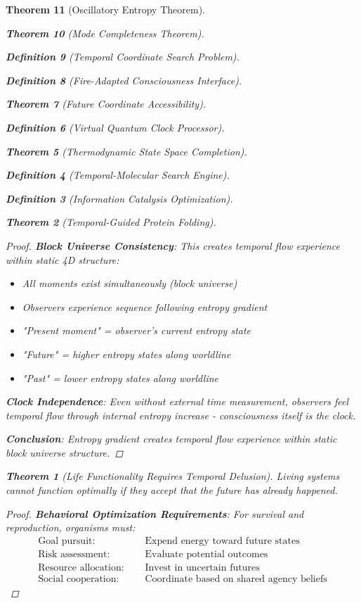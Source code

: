 \documentclass[12pt,a4paper]{article}
\newtheorem{theorem}{Theorem}[section]
\newtheorem{definition}[theorem]{Definition}
\begin{document}
\begin{theorem}[Oscillatory Entropy Theorem]
\begin{theorem}[Mode Completeness Theorem]
\begin{enumerate}
\begin{definition}[Temporal Coordinate Search Problem]
\begin{algorithm}
\begin{definition}[Fire-Adapted Consciousness Interface]
\begin{theorem}[Future Coordinate Accessibility]
\begin{definition}[Virtual Quantum Clock Processor]
\begin{itemize}
\begin{itemize}
\begin{theorem}[Thermodynamic State Space Completion]
\begin{definition}[Temporal-Molecular Search Engine]
\begin{definition}[Information Catalysis Optimization]
\begin{algorithm}
\begin{theorem}[Temporal-Guided Protein Folding]
\begin{table}[h]
\begin{proof}
\textbf{Block Universe Consistency}: This creates temporal flow experience within static 4D structure:
\begin{itemize}
    \item All moments exist simultaneously (block universe)
    \item Observers experience sequence following entropy gradient
    \item "Present moment" = observer's current entropy state
    \item "Future" = higher entropy states along worldline
    \item "Past" = lower entropy states along worldline
\end{itemize}

\textbf{Clock Independence}: Even without external time measurement, observers feel temporal flow through internal entropy increase - consciousness itself is the clock.

\textbf{Conclusion}: Entropy gradient creates temporal flow experience within static block universe structure.
\end{proof}

\begin{theorem}[Life Functionality Requires Temporal Delusion]
Living systems cannot function optimally if they accept that the future has already happened.
\end{theorem}

\begin{proof}
\textbf{Behavioral Optimization Requirements}: For survival and reproduction, organisms must:
\begin{align}
\text{Goal pursuit: } &\quad \text{Expend energy toward future states} \\
\text{Risk assessment: } &\quad \text{Evaluate potential outcomes} \\
\text{Resource allocation: } &\quad \text{Invest in uncertain futures} \\
\text{Social cooperation: } &\quad \text{Coordinate based on shared agency beliefs}
\end{align}


\end{proof}
\end{table}
\end{theorem}
\end{algorithm}
\end{definition}
\end{definition}
\end{theorem}
\end{itemize}
\end{itemize}
\end{definition}
\end{theorem}
\end{definition}
\end{algorithm}
\end{definition}
\end{enumerate}
\end{theorem}
\end{theorem}
\end{document}
